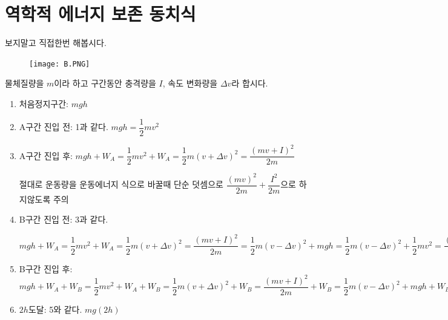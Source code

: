 \documentclass{oblivoir}
\begin{document}
\section{역학적 에너지 보존 동치식}
보지말고 직접한번 해봅시다.
\begin{figure}[h!]
    \centering
    \texttt{[image: B.PNG]}
    \label{fig:my_label}
\end{figure}
물체질량을 $m$이라 하고 구간동안 충격량을 $I$, 속도 변화량을 $\Delta v$라 합시다.
\begin{enumerate}
    \item 처음정지구간: $mgh$
    \item A구간 진입 전: 1과 같다. $mgh = \dfrac{1}{2}mv^2$
    \item  A구간 진입 후: $mgh + W_A  =\dfrac{1}{2}mv^2 + W_A = \dfrac{1}{2}m(v+\Delta v)^2 = \dfrac{(mv + I)^2}{2m}$ \begin{justbox}
    절대로 운동량을 운동에너지 식으로 바꿀때 단순 덧셈으로
    $\dfrac{(mv)^2}{2m}+\dfrac{I^2}{2m}$으로 하지않도록 주의 
    \end{justbox}
    \item  B구간 진입 전: 3과 같다.\par
    $mgh + W_A  =\dfrac{1}{2}mv^2 + W_A = \dfrac{1}{2}m(v+\Delta v)^2 = \dfrac{(mv + I)^2}{2m} = \dfrac{1}{2}m(v-\Delta v)^2 + mgh = \dfrac{1}{2}m(v-\Delta v)^2 + \dfrac{1}{2}mv^2= \dfrac{(mv - I)^2}{2m} +mgh$
    \item B구간 진입 후:   $mgh + W_A + W_B = \dfrac{1}{2}mv^2 + W_A + W_B = \dfrac{1}{2}m(v+\Delta v)^2 + W_B = \dfrac{(mv + I)^2}{2m} + W_B = \dfrac{1}{2}m(v-\Delta v)^2 + mgh + W_B = \dfrac{1}{2}m(v-\Delta v)^2 + \dfrac{1}{2}mv^2 + W_B = \dfrac{(mv - I)^2}{2m} + mgh + W_B = \dfrac{1}{2}mv^2 + mgh $
    \item $2h$도달: 5와 같다. $mg(2h)$
\end{enumerate}
\end{document}

